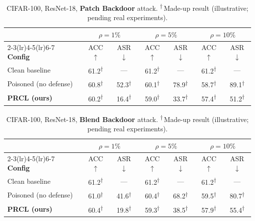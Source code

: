\documentclass[11pt,a4paper]{article}
\newcommand{\madeupresult}[1]{\textcolor{madeup}{#1\textsuperscript{$\dagger$}}}
\newcommand{\daggernote}{\textsuperscript{$\dagger$}\,\textcolor{madeup}{Made-up result (illustrative; pending real experiments).}}
\begin{document}
\begin{table}[h]
\centering
\caption{CIFAR-100, ResNet-18, \textbf{Patch Backdoor} attack. \daggernote}
\label{tab:cifar100_patch}
\begin{tabular}{@{}l cc cc cc@{}}
\toprule
& \multicolumn{2}{c}{$\rho=1\%$}
& \multicolumn{2}{c}{$\rho=5\%$}
& \multicolumn{2}{c}{$\rho=10\%$} \\
\cmidrule(lr){2-3}\cmidrule(lr){4-5}\cmidrule(lr){6-7}
\textbf{Config}
& ACC$\uparrow$ & ASR$\downarrow$
& ACC$\uparrow$ & ASR$\downarrow$
& ACC$\uparrow$ & ASR$\downarrow$ \\
\midrule
Clean baseline
  & \madeupresult{61.2} & ---
  & \madeupresult{61.2} & ---
  & \madeupresult{61.2} & --- \\
Poisoned (no defense)
  & \madeupresult{60.8} & \madeupresult{52.3}
  & \madeupresult{60.1} & \madeupresult{78.9}
  & \madeupresult{58.7} & \madeupresult{89.1} \\
\textbf{PRCL (ours)}
  & \madeupresult{60.2} & \madeupresult{16.4}
  & \madeupresult{59.0} & \madeupresult{33.7}
  & \madeupresult{57.4} & \madeupresult{51.2} \\
\bottomrule
\end{tabular}
\end{table}

\begin{table}[h]
\centering
\caption{CIFAR-100, ResNet-18, \textbf{Blend Backdoor} attack. \daggernote}
\label{tab:cifar100_blend}
\begin{tabular}{@{}l cc cc cc@{}}
\toprule
& \multicolumn{2}{c}{$\rho=1\%$}
& \multicolumn{2}{c}{$\rho=5\%$}
& \multicolumn{2}{c}{$\rho=10\%$} \\
\cmidrule(lr){2-3}\cmidrule(lr){4-5}\cmidrule(lr){6-7}
\textbf{Config}
& ACC$\uparrow$ & ASR$\downarrow$
& ACC$\uparrow$ & ASR$\downarrow$
& ACC$\uparrow$ & ASR$\downarrow$ \\
\midrule
Clean baseline
  & \madeupresult{61.2} & ---
  & \madeupresult{61.2} & ---
  & \madeupresult{61.2} & --- \\
Poisoned (no defense)
  & \madeupresult{61.0} & \madeupresult{41.6}
  & \madeupresult{60.4} & \madeupresult{68.2}
  & \madeupresult{59.5} & \madeupresult{80.7} \\
\textbf{PRCL (ours)}
  & \madeupresult{60.4} & \madeupresult{19.8}
  & \madeupresult{59.3} & \madeupresult{38.5}
  & \madeupresult{57.9} & \madeupresult{55.4} \\
\bottomrule
\end{tabular}
\end{table}
\end{document}

